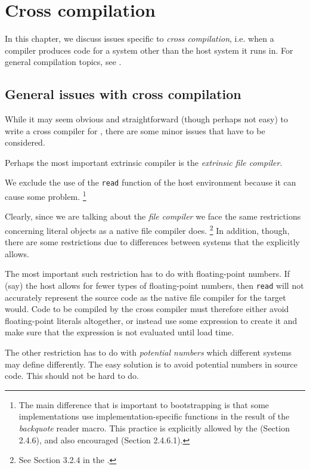 \chapter{Cross compilation}
\label{chap-cross-compilation}

In this chapter, we discuss issues specific to \emph{cross
  compilation}, i.e. when a compiler produces code for a system other
than the host \commonlisp{} system it runs in.  For general compilation
topics, see .

\section{General issues with cross compilation}

While it may seem obvious and straightforward (though perhaps not
easy) to write a cross compiler for \commonlisp{}, there are some minor issues
that have to be considered. 

Perhaps the most important extrinsic compiler is the \emph{extrinsic
  file compiler}.

We exclude the use of the \texttt{read} function of the host
environment because it can cause some problem.%
\footnote{The main difference that is important to bootstrapping is
  that some implementations use implementation-specific functions in
  the result of the \emph{backquote} reader macro.  This practice is
  explicitly allowed by the \hs{} (Section 2.4.6), and also encouraged
  (Section 2.4.6.1).}

Clearly, since we are talking about the \emph{file compiler} we face
the same restrictions concerning literal objects as a native file
compiler does.%
\footnote{See Section 3.2.4 in the \hs{}.} %
In addition, though, there are some restrictions due to differences
between systems that the \hs{} explicitly allows.  

The most important such restriction has to do with floating-point
numbers.  If (say) the host allows for fewer types of floating-point
numbers, then \texttt{read} will not accurately represent the source
code as the native file compiler for the target would.  Code to be
compiled by the cross compiler must therefore either avoid
floating-point literals altogether, or instead use some expression to
create it and make sure that the expression is not evaluated until
load time.  

The other restriction has to do with \emph{potential numbers} which
different systems may define differently.  The easy solution is to
avoid potential numbers in source code.  This should not be hard to
do. 

